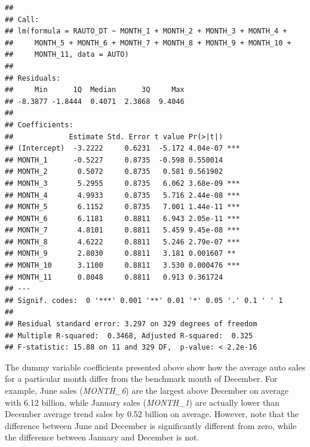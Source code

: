 \documentclass[
]{book}
\begin{document}
\begin{verbatim}
## 
## Call:
## lm(formula = RAUTO_DT ~ MONTH_1 + MONTH_2 + MONTH_3 + MONTH_4 + 
##     MONTH_5 + MONTH_6 + MONTH_7 + MONTH_8 + MONTH_9 + MONTH_10 + 
##     MONTH_11, data = AUTO)
## 
## Residuals:
##     Min      1Q  Median      3Q     Max 
## -8.3877 -1.8444  0.4071  2.3868  9.4046 
## 
## Coefficients:
##             Estimate Std. Error t value Pr(>|t|)    
## (Intercept)  -3.2222     0.6231  -5.172 4.04e-07 ***
## MONTH_1      -0.5227     0.8735  -0.598 0.550014    
## MONTH_2       0.5072     0.8735   0.581 0.561902    
## MONTH_3       5.2955     0.8735   6.062 3.68e-09 ***
## MONTH_4       4.9933     0.8735   5.716 2.44e-08 ***
## MONTH_5       6.1152     0.8735   7.001 1.44e-11 ***
## MONTH_6       6.1181     0.8811   6.943 2.05e-11 ***
## MONTH_7       4.8101     0.8811   5.459 9.45e-08 ***
## MONTH_8       4.6222     0.8811   5.246 2.79e-07 ***
## MONTH_9       2.8030     0.8811   3.181 0.001607 ** 
## MONTH_10      3.1100     0.8811   3.530 0.000476 ***
## MONTH_11      0.8048     0.8811   0.913 0.361724    
## ---
## Signif. codes:  0 '***' 0.001 '**' 0.01 '*' 0.05 '.' 0.1 ' ' 1
## 
## Residual standard error: 3.297 on 329 degrees of freedom
## Multiple R-squared:  0.3468, Adjusted R-squared:  0.325 
## F-statistic: 15.88 on 11 and 329 DF,  p-value: < 2.2e-16
\end{verbatim}

The dummy variable coefficients presented above show how the average auto sales for a particular month differ from the benchmark month of December. For example, June sales (\emph{MONTH\_6}) are the largest above December on average with 6.12 billion, while January sales (\emph{MONTH\_1}) are actually lower than December average trend sales by 0.52 billion on average. However, note that the difference between June and December is significantly different from zero, while the difference between January and December is not.
\end{document}
